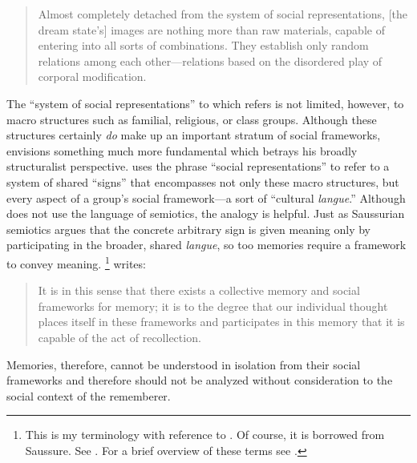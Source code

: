 \begin{quote}
    Almost completely detached from the system of social representations, {[}the dream state's{]} images are nothing more than raw materials, capable of entering into all sorts of combinations. They establish only random relations among each other---relations based on the disordered play of corporal modification.%
        \autocite[42]{halbwachs1992}
\end{quote}  
\noindent
The ``system of social representations'' to which \halbwachs refers is not limited, however, to macro structures such as familial, religious, or class groups. Although these structures certainly \emph{do} make up an important stratum of social frameworks, \halbwachs envisions something much more fundamental which betrays his broadly structuralist perspective. \halbwachs uses the phrase ``social representations'' to refer to a system of shared ``signs'' that encompasses not only these macro structures, but every aspect of a group's social framework---a sort of ``cultural \emph{langue}.'' Although \halbwachs does not use the language of semiotics, the analogy is helpful. Just as Saussurian semiotics argues that the concrete arbitrary sign is given meaning only by participating in the broader, shared \emph{langue}, so too memories require a framework to convey meaning.%
    \footnote{%
        This is my terminology with reference to \halbwachs. Of course, it is borrowed from Saussure. See 
        \cite{saussure1916}. For a brief overview of these terms see 
        \cite[93--94]{smith-riley2009}.}
%
\halbwachs writes:  

\begin{quote}
    It is in this sense that there exists a collective memory and social frameworks for memory; it is to the degree that our individual thought places itself in these frameworks and participates in this memory that it is capable of the act of recollection.%
        \autocite[38]{halbwachs1992}
\end{quote}  
\noindent
Memories, therefore, cannot be understood in isolation from their social frameworks and therefore should not be analyzed without consideration to the social context of the rememberer.  

